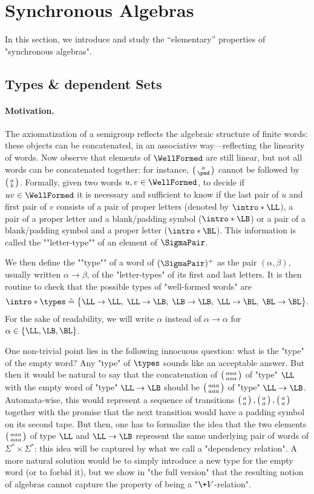 \section{Synchronous Algebras}
\label{sec:synchronous-algebras}

In this section, we introduce and study the ``elementary'' properties of "synchronous algebras".

\subsection{Types \& dependent Sets}

\paragraph*{Motivation.} The axiomatization of a semigroup reflects the algebraic structure of
finite words: these objects can be concatenated, in an associative way---reflecting the linearity of 
words. Now observe that elements of $\WellFormed$ are still linear, but
not all words can be concatenated together: for instance, $\pair{a}{\pad}$
cannot be followed by $\pair{a}{b}$.
Formally, given two words $u, v \in \WellFormed$, to decide if $uv \in \WellFormed$
it is necessary and sufficient to know if the last pair of $u$ and first pair of $v$
consists of a pair of proper letters (denoted by \AP$\intro*\LL$), a pair of a proper letter and a blank/padding symbol (\AP$\intro*\LB$) or a pair of a blank/padding symbol and a proper letter (\AP$\intro*\BL$). This information is called the \AP""letter-type"" of an element of $\SigmaPair$.

We then define the \AP""type"" of a word of $(\SigmaPair)^+$ as the pair $(\alpha, \beta)$,
usually written $\alpha \to \beta$, of the "letter-types" of its first and last letters.
It is then routine to check that the possible types of "well-formed words" are
\[
	\intro*\types \defeq \big\{
		\LL\to\LL,\; \LL\to\LB,\; \LB\to\LB,\; \LL\to\BL,\; \BL\to\BL
	\big\}.
\]
For the sake of readability, we will write $\alpha$ instead of $\alpha \to \alpha$
for $\alpha \in \{\LL, \LB, \BL\}$.

One non-trivial point lies in the following innocuous question: what is the "type" of the empty word? Any "type" of $\types$ sounds like an acceptable answer. But then
it would be natural to say that the concatenation of $\pair{aaa}{aaa}$ of "type" $\LL$ with the empty word of "type" $\LL\to\LB$ should be $\pair{aaa}{aaa}$ of "type" $\LL\to\LB$. Automata-wise,
this would represent a sequence of transitions $\pair{a}{a}, \pair{a}{a}, \pair{a}{a}$ together with
the promise that the next transition would have a padding symbol on its second tape. But then, 
one has to formalize the idea that the two elements $\pair{aaa}{aaa}$ of type $\LL$ and $\LL\to\LB$
represent the same underlying pair of words of $\Sigma^*\times\Sigma^*$: this idea will be captured by what we call a "dependency relation". A more natural solution would be to simply introduce a
new type for the empty word (or to forbid it), but we show in "the full version" that
the resulting notion of algebras cannot capture the property of being a "$\+V$-relation".

